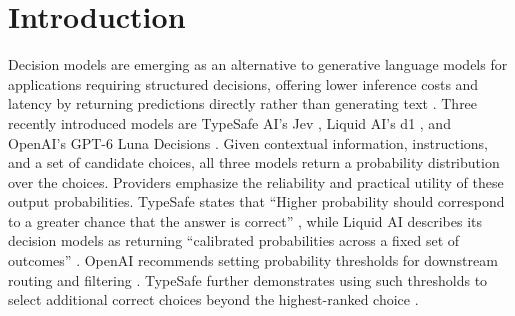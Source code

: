 
\section{Introduction}
\suppressfloats[t]
\begin{table}[t]
\caption{An example from HotpotQA asks which of the two tennis players is older and lists 10 passages. The two equally relevant passages below are necessary and sufficient to answer the question. However, the models concentrate almost all probability on one passage. The full list is in Appendix~\ref{app:example}.}
\label{tab:example}
\centering
\small


\end{table}

\begin{table}[t]
\caption{TypeSafe's documented example of a support ticket that mentions a wrong size and a missing refund. A second team with a probability above 0.25 also receives the ticket~\citep{typesafe2026choice}.}
\label{tab:typesafe}
\centering
\small

\end{table}

Decision models are emerging as an alternative to generative language models for applications requiring structured decisions, offering lower inference costs and latency by returning predictions directly rather than generating text \citep{almeida2026jev,liquidAI2026d1}. Three recently introduced models are TypeSafe AI's Jev \citep{almeida2026jev}, Liquid AI's d1 \citep{liquidAI2026d1}, and OpenAI's GPT-6 Luna Decisions \citep{openai2026decisions}. Given contextual information, instructions, and a set of candidate choices, all three models return a probability distribution over the choices. Providers emphasize the reliability and practical utility of these output probabilities. TypeSafe states that ``Higher probability should correspond to a greater chance that the answer is correct'' \citep{typesafe2026primer}, while Liquid AI describes its decision models as returning ``calibrated probabilities across a fixed set of outcomes'' \citep{liquid2026models}. OpenAI recommends setting probability thresholds for downstream routing and filtering \citep{openai2026decisions}. TypeSafe further demonstrates using such thresholds to select additional correct choices beyond the highest-ranked choice \citep{typesafe2026choice}.


